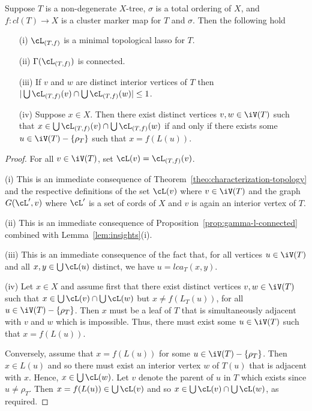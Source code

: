 \begin{lem}
  \label{lem:insights}
  Suppose $T$ is a non-degenerate $X$-tree, $\sigma$ is a total ordering of
  $X$, and $f:cl(T)\to X$ is a cluster marker map for $T$ and $\sigma$. Then
  the following hold
  \begin{enumerate}
  \item[(i)] $\cL_{(T,f)}$ is a minimal topological lasso for $T$.
  \item[(ii)] $\Gamma(\cL_{(T,f)})$ is connected.
  \item[(iii)] If $v$ and $w$ are distinct interior vertices of $T$ then
    $|\bigcup \cL_{(T,f)}(v)\cap \bigcup \cL_{(T,f)}(w)|\leq 1$.
  \item[(iv)] Suppose $x\in X$. Then there exist distinct vertices $v,w\in
    \iV(T)$ such that $x\in \bigcup \cL_{(T,f)}(v)\cap \bigcup \cL_{(T,f)}(w)$
    if and only if there exists some $u\in \iV(T)-\{\rho_T\}$ such that
    $x=f(L(u))$.
  \end{enumerate}
\end{lem}
\begin{proof}
  For all $v\in \iV(T)$, set $\cL(v)=\cL_{(T,f)}(v)$.

  (i) This is an immediate consequence of
  Theorem~\ref{theo:characterization-topology} and the respective definitions
  of the set $\cL(v)$ where $v\in \iV(T)$ and the graph $G(\cL',v)$ where
  $\cL'$ is a set of cords of $X$ and $v$ is again an interior vertex of $T$.
 

  (ii) This is an immediate consequence of
  Proposition~\ref{prop:gamma-l-connected} combined with
  Lemma~\ref{lem:insights}(i).


  (iii) This is an immediate consequence of the fact that, for all vertices
  $u\in \iV(T)$ and all $x,y\in \bigcup\cL(u)$ distinct, we have
  $u=lca_T(x,y)$.

  (iv) Let $x\in X$ and assume first that there exist distinct vertices
  $v,w\in \iV(T)$ such that $x\in \bigcup \cL(v)\cap \bigcup \cL(w)$ but
  $x\not =f(L_T(u))$, for all $u\in \iV(T)-\{\rho_T\}$. Then $x$ must be a
  leaf of $T$ that is simultaneously adjacent with $v$ and $w$ which is
  impossible. Thus, there must exist some $u\in \iV(T)$ such that $x=f(L(u))$.

  Conversely, assume that $x=f(L(u))$ for some $u\in \iV(T)-\{\rho_T\}$. Then
  $x\in L(u)$ and so there must exist an interior vertex $w$ of $T(u)$ that is
  adjacent with $x$.  Hence, $x\in\bigcup \cL(w)$.  Let $v$ denote the parent
  of $u$ in $T$ which exists since $u\not=\rho_T$.  Then $x=f(L(u))\in \bigcup
  \cL(v)$ and so $x\in \bigcup \cL(v)\cap \bigcup \cL(w)$, as required.
\end{proof}

